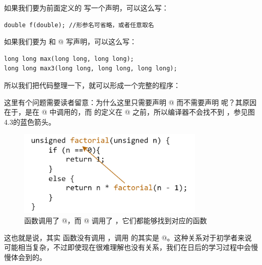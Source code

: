 如果我们要为前面定义的 \lstinline@f@ 写一个声明，可以这么写：
\begin{lstlisting}
double f(double); //形参名可省略，或者任意取名
\end{lstlisting}
如果我们要为 \lstinline@max@ 和 @ 写声明，可以这么写：
\begin{lstlisting}
long long max(long long, long long); 
long long max3(long long, long long, long long);
\end{lstlisting}\par
所以我们把代码整理一下，就可以形成一个完整的程序：
\par
这里有个问题需要读者留意：为什么这里只需要声明 @ 而不需要声明 \lstinline@max@ 呢？其原因在于，\lstinline@max@ 是在 @ 中调用的，而 \lstinline@max@ 的定义在 @ 之前，所以编译器不会找不到 \lstinline@max@，参见图4.3的蓝色箭头。\par
\begin{figure}[htbp]
    \centering
    \includegraphics[width=0.8\textwidth]{../images/generalized_parts/04_max3_code_logic_300.png}
    \caption{\lstinline@main@ 函数调用了 @，而 @ 调用了 \lstinline@max@，它们都能够找到对应的函数}
\end{figure}
这也就是说，其实 \lstinline@main@ 函数没有调用 \lstinline@max@，调用 \lstinline@max@ 的其实是 @。这种关系对于初学者来说可能相当复杂，不过即使现在很难理解也没有关系，我们在日后的学习过程中会慢慢体会到的。\par
